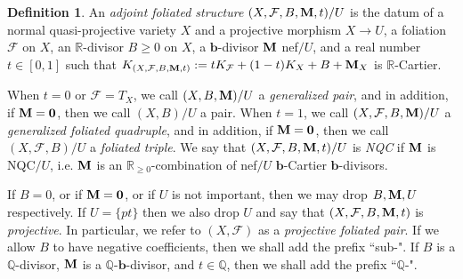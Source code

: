 \documentclass[12pt]{amsart}
\numberwithin{equation}{section}
\newcommand{\bb}{\bm{b}}
\newcommand{\Mm}{{\bf{M}}}
\newcommand{\Qq}{\mathbb{Q}}
\newcommand{\Rr}{\mathbb{R}}
\newcommand{\Ff}{\mathcal{F}}
\theoremstyle{definition}
\newtheorem{defn}[thm]{Definition}
\theoremstyle{definition}
\theoremstyle{definition}
\begin{document}
\begin{defn}\label{defn: afs}
An \emph{adjoint foliated structure} $(X,\Ff,B,\Mm,t)/U$ is the datum of a normal quasi-projective variety $X$ and a projective morphism $X\rightarrow U$, a foliation $\Ff$ on $X$, an $\Rr$-divisor $B\geq 0$ on $X$, a $\bb$-divisor $\Mm$ nef$/U$, and a real number $t\in [0,1]$ such that $K_{(X,\Ff,B,\Mm,t)}:=tK_{\Ff}+(1-t)K_X+B+\Mm_X$ is $\Rr$-Cartier. 

When $t=0$ or $\Ff=T_X$, we call $(X,B,\Mm)/U$ a \emph{generalized pair}, and in addition, if $\Mm=\bm{0}$, then we call $(X,B)/U$ a pair. 
When $t=1$, we call $(X,\Ff,B,\Mm)/U$ a \emph{generalized foliated quadruple}, and in addition, if $\Mm=\bm{0}$, then we call $(X,\Ff,B)/U$ a \emph{foliated triple}. We say that $(X,\Ff,B,\Mm,t)/U$ is \emph{NQC} if $\Mm$ is NQC$/U$, i.e. $\Mm$ is an $\mathbb R_{\geq 0}$-combination of nef$/U$ $\bb$-Cartier $\bb$-divisors.

If $B=0$, or if $\Mm=\bm{0}$, or if $U$ is not important, then we may drop $B,\Mm,U$ respectively. If $U=\{pt\}$ then we also drop $U$ and say that $(X,\Ff,B,\Mm,t)$ is \emph{projective}. 
In particular, we refer to $(X,\mathcal F)$ as a \emph{projective foliated pair}. 
If we allow $B$ to have negative coefficients, then we shall add the prefix ``sub-". If $B$ is a $\Qq$-divisor, $\Mm$ is a $\Qq$-$\bb$-divisor, and $t\in\mathbb Q$, then we shall add the prefix ``$\Qq$-".
\end{defn}
\end{document}
